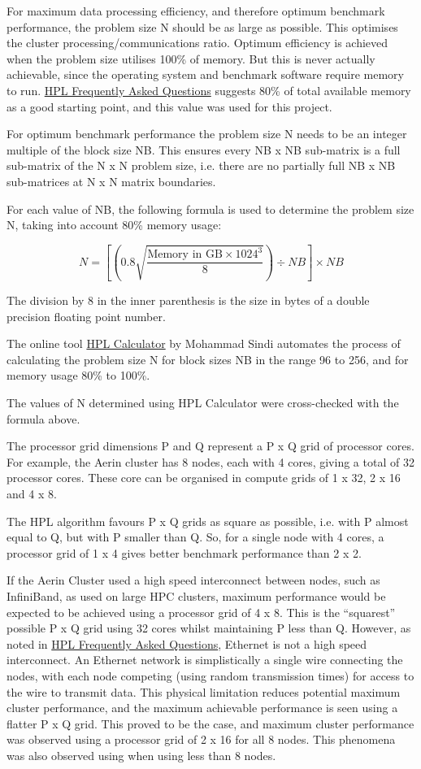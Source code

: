 For maximum data processing efficiency, and therefore optimum benchmark performance, the problem size N should be as large as possible. This optimises the cluster processing/communications ratio. Optimum efficiency is achieved when the problem size utilises 100\% of memory. But this is never actually achievable, since the operating system and benchmark software require memory to run. \href{https://www.netlib.org/benchmark/hpl/faqs.html}{HPL Frequently Asked Questions} suggests 80\% of total available memory as a good starting point, and this value was used for this project.

For optimum benchmark performance the problem size N needs to be an integer multiple of the block size NB. This ensures every NB x NB sub-matrix is a full sub-matrix of the N x N problem size, i.e. there are no partially full NB x NB sub-matrices at N x N matrix boundaries.

For each value of NB, the following formula is used to determine the problem size N, taking into account 80\% memory usage:

\[N = \left[\left(0.8 \sqrt{\frac{\text{Memory in GB} \times 1024^3}{8}}\right) \div NB\right] \times NB\]

The division by 8 in the inner parenthesis is the size in bytes of a double precision floating point number.


The online tool \href{http://hpl-calculator.sourceforge.net}{HPL Calculator} by Mohammad Sindi automates the process of calculating the problem size N for block sizes NB in the range 96 to 256, and for memory usage 80\% to 100\%.

The values of N determined using HPL Calculator were cross-checked with the formula above.

The processor grid dimensions P and Q represent a P x Q grid of processor cores. For example, the Aerin cluster has 8 nodes, each with 4 cores, giving a total of 32 processor cores. These core can be organised in compute grids of 1 x 32, 2 x 16 and 4 x 8.

The HPL algorithm favours P x Q grids as square as possible, i.e. with P almost equal to Q, but with P smaller than Q. So, for a single node with 4 cores, a processor grid of 1 x 4 gives better benchmark performance than 2 x 2.

If the Aerin Cluster used a high speed interconnect between nodes, such as InfiniBand, as used on large HPC clusters, maximum performance would be expected to be achieved using a processor grid of 4 x 8. This is the ``squarest'' possible P x Q grid using 32 cores whilst maintaining P less than Q. However, as noted in \href{https://www.netlib.org/benchmark/hpl/faqs.html}{HPL Frequently Asked Questions}, Ethernet is not a high speed interconnect. An Ethernet network is simplistically a single wire connecting the nodes, with each node competing (using random transmission times) for access to the wire to transmit data. This physical limitation reduces potential maximum cluster performance, and the maximum achievable performance is seen using a flatter P x Q grid. This proved to be the case, and maximum cluster performance was observed using a processor grid of 2 x 16 for all 8 nodes. This phenomena was also observed using when using less than 8 nodes.


